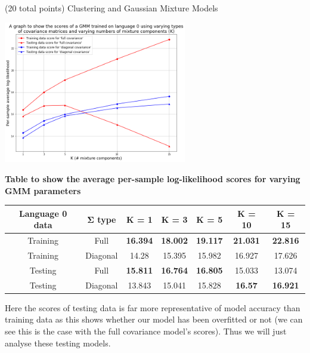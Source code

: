 \documentclass[12pt]{article}
\begin{document}
\begin{question}{(20 total points) Clustering and Gaussian Mixture Models}
\begin{subquestion}
      \begin{answerbox}{30em}
        \scriptsize{
        \begin{center}
        \includegraphics[width=0.6\textwidth]{images/q35.png}
        \end{center}
        \begin{center}
        \textbf{Table to show the average per-sample log-likelihood scores for varying GMM parameters}\\
        \begin{tabular}{ |c|c|c|c|c|c|c| } \hline
        \textbf{Language 0 data} & \textbf{$\mathbf{\Sigma}$ type} & \textbf{K = 1} & \textbf{K = 3} & \textbf{K = 5} & \textbf{K = 10} & \textbf{K = 15} \\ \hline
        Training & Full & \textbf{\textcolor{OliveGreen}{16.394}} & \textbf{\textcolor{OliveGreen}{18.002}} & \textbf{\textcolor{OliveGreen}{19.117}} & \textbf{\textcolor{OliveGreen}{21.031}} & \textbf{\textcolor{OliveGreen}{22.816}} \\
        Training & Diagonal & 14.28 & 15.395 & 15.982 & 16.927 & 17.626 \\ \hline
        Testing & Full & \textbf{\textcolor{OliveGreen}{15.811}} & \textbf{\textcolor{OliveGreen}{16.764}} & \textbf{\textcolor{OliveGreen}{16.805}} & 15.033 & 13.074 \\ 
        Testing & Diagonal & 13.843 & 15.041 & 15.828 & \textbf{\textcolor{OliveGreen}{16.57}} & \textbf{\textcolor{OliveGreen}{16.921}} \\ \hline
        \end{tabular}
        \end{center}
        Here the scores of testing data is far more representative of model accuracy than training data as this shows whether our model has been overfitted or not (we can see this is the case with the full covariance model's scores). Thus we will just analyse these testing models.\\
}
\end{answerbox}
\end{subquestion}
\end{question}
\end{document}
